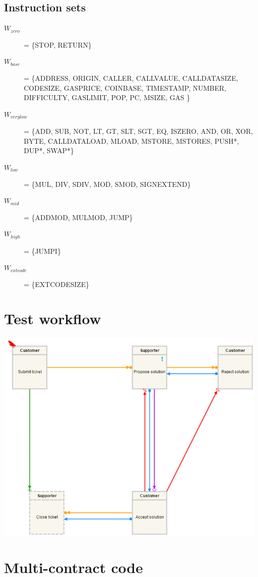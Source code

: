 \documentclass{article}
\begin{document}
		\subsection{Instruction sets}
		\begin{description}
			\item[$W_{zero}$] = \{STOP, RETURN\}
			\item[$W_{base}$] = \{ADDRESS, ORIGIN, CALLER, CALLVALUE, CALLDATASIZE, CODESIZE, GASPRICE, COINBASE, TIMESTAMP, NUMBER, DIFFICULTY, GASLIMIT, POP, PC, MSIZE, GAS \}
			\item[$W_{verylow}$] = \{ADD, SUB, NOT, LT, GT, SLT, SGT, EQ, ISZERO, AND, OR, XOR, BYTE, CALLDATALOAD, MLOAD, MSTORE, MSTORES, PUSH*, DUP*, SWAP*\}
			\item[$W_{low}$] = \{MUL, DIV, SDIV, MOD, SMOD, SIGNEXTEND\}
			\item[$W_{mid}$] = \{ADDMOD, MULMOD, JUMP\}
			\item[$W_{high}$] = \{JUMPI\}
			\item[$W_{extcode}$] = \{EXTCODESIZE\}			
		\end{description}

	\section{Test workflow}

		\includegraphics[scale=0.45]{figures/ExampleWorkflow.png}

	\section{Multi-contract code}
	\label{app:multi-contract-code}
\end{document}
